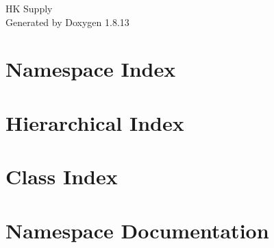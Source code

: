 \documentclass[twoside]{book}
\newcommand{\+}{\discretionary{\mbox{\scriptsize$\hookleftarrow$}}{}{}}
\newcommand{\clearemptydoublepage}{%
  \newpage{\pagestyle{empty}\cleardoublepage}%
}
\begin{document}
\hypersetup{pageanchor=false,
             bookmarksnumbered=true,
             pdfencoding=unicode
            }
\begin{titlepage}
\vspace*{7cm}
\begin{center}%
{\Large HK Supply }\\
\vspace*{1cm}
{\large Generated by Doxygen 1.8.13}\\
\end{center}
\end{titlepage}
\clearemptydoublepage
{}
\tableofcontents
\clearemptydoublepage
{}
\hypersetup{pageanchor=true}

\chapter{Namespace Index}

\chapter{Hierarchical Index}

\chapter{Class Index}

\chapter{Namespace Documentation}




















\end{document}
